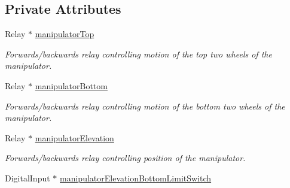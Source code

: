 \subsection*{Private Attributes}
\begin{DoxyCompactItemize}
\item 
\hypertarget{class_r_j_f_r_c2011_1_1_manipulator_a4f4fe572a4f6c9de7ac055ec3e82998a}{
Relay $\ast$ \hyperlink{class_r_j_f_r_c2011_1_1_manipulator_a4f4fe572a4f6c9de7ac055ec3e82998a}{manipulatorTop}}
\label{class_r_j_f_r_c2011_1_1_manipulator_a4f4fe572a4f6c9de7ac055ec3e82998a}

\begin{DoxyCompactList}\small\item\em Forwards/backwards relay controlling motion of the top two wheels of the manipulator. \item\end{DoxyCompactList}\item 
\hypertarget{class_r_j_f_r_c2011_1_1_manipulator_af1db53bedc275af45188e6e6b9eb49ad}{
Relay $\ast$ \hyperlink{class_r_j_f_r_c2011_1_1_manipulator_af1db53bedc275af45188e6e6b9eb49ad}{manipulatorBottom}}
\label{class_r_j_f_r_c2011_1_1_manipulator_af1db53bedc275af45188e6e6b9eb49ad}

\begin{DoxyCompactList}\small\item\em Forwards/backwards relay controlling motion of the bottom two wheels of the manipulator. \item\end{DoxyCompactList}\item 
\hypertarget{class_r_j_f_r_c2011_1_1_manipulator_a238beace9d7ec18206355cda8f16e030}{
Relay $\ast$ \hyperlink{class_r_j_f_r_c2011_1_1_manipulator_a238beace9d7ec18206355cda8f16e030}{manipulatorElevation}}
\label{class_r_j_f_r_c2011_1_1_manipulator_a238beace9d7ec18206355cda8f16e030}

\begin{DoxyCompactList}\small\item\em Forwards/backwards relay controlling position of the manipulator. \item\end{DoxyCompactList}\item 
\hypertarget{class_r_j_f_r_c2011_1_1_manipulator_ad6cf395460dcc047add99f5f9fbb1683}{
DigitalInput $\ast$ \hyperlink{class_r_j_f_r_c2011_1_1_manipulator_ad6cf395460dcc047add99f5f9fbb1683}{manipulatorElevationBottomLimitSwitch}}
\label{class_r_j_f_r_c2011_1_1_manipulator_ad6cf395460dcc047add99f5f9fbb1683}


\end{DoxyCompactItemize}
